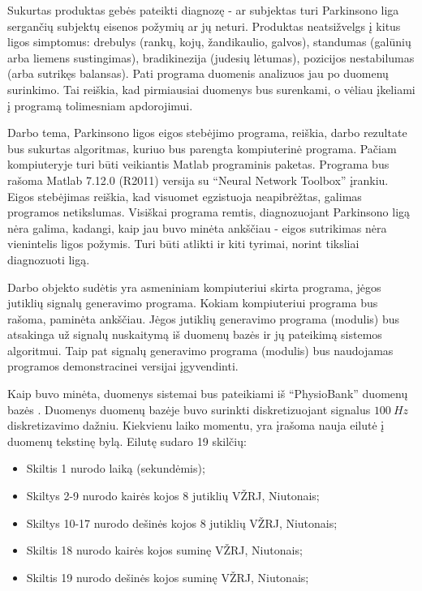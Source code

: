 \documentclass[]{vgtuef}
\begin{document}
Sukurtas produktas gebės pateikti diagnozę - ar subjektas turi Parkinsono liga sergančių subjektų eisenos požymių ar jų neturi. Produktas neatsižvelgs į kitus ligos simptomus: drebulys (rankų, kojų, žandikaulio, galvos), standumas (galūnių arba liemens sustingimas), bradikinezija (judesių lėtumas), pozicijos nestabilumas (arba sutrikęs balansas). Pati programa duomenis analizuos jau po duomenų surinkimo. Tai reiškia, kad pirmiausiai duomenys bus surenkami, o vėliau įkeliami į programą tolimesniam apdorojimui.

Darbo tema, Parkinsono ligos eigos stebėjimo programa, reiškia, darbo rezultate bus sukurtas algoritmas, kuriuo bus parengta kompiuterinė programa. Pačiam kompiuteryje turi būti veikiantis Matlab programinis paketas. Programa bus rašoma Matlab 7.12.0 (R2011) versija su ``Neural Network Toolbox'' įrankiu. Eigos stebėjimas reiškia, kad visuomet egzistuoja neapibrėžtas, galimas programos netikslumas. Visiškai programa remtis, diagnozuojant Parkinsono ligą nėra galima, kadangi, kaip jau buvo minėta ankščiau - eigos sutrikimas nėra vienintelis ligos požymis. Turi būti atlikti ir kiti tyrimai, norint tiksliai diagnozuoti ligą.

Darbo objekto sudėtis yra asmeniniam kompiuteriui skirta programa, jėgos jutiklių signalų generavimo programa. Kokiam kompiuteriui programa bus rašoma, paminėta ankščiau. Jėgos jutiklių generavimo programa (modulis) bus atsakinga už signalų nuskaitymą iš duomenų bazės ir jų pateikimą sistemos algoritmui. Taip pat signalų generavimo programa (modulis) bus naudojamas programos demonstracinei versijai įgyvendinti.

Kaip buvo minėta, duomenys sistemai bus pateikiami iš ``PhysioBank'' duomenų bazės \cite{932728}. Duomenys duomenų bazėje buvo surinkti diskretizuojant signalus $100~Hz$ diskretizavimo dažniu. Kiekvienu laiko momentu, yra įrašoma nauja eilutė į duomenų tekstinę bylą. Eilutę sudaro 19 skilčių:

\begin{itemize}
\item Skiltis 1 nurodo laiką (sekundėmis);
\item Skiltys 2-9 nurodo kairės kojos 8 jutiklių VŽRJ, Niutonais;
\item Skiltys 10-17 nurodo dešinės kojos 8 jutiklių VŽRJ, Niutonais;
\item Skiltis 18 nurodo kairės kojos suminę VŽRJ, Niutonais;
\item Skiltis 19 nurodo dešinės kojos suminę VŽRJ, Niutonais;
\end{itemize}
\end{document}
